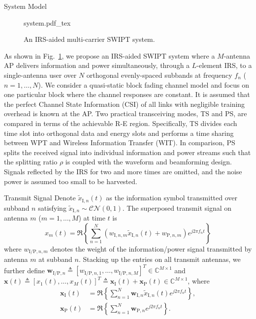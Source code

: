 \documentclass[journal]{IEEEtran}
\begin{document}
	\begin{section}{System Model}\label{se:system_model}
		\begin{figure}[!t]
			\centering
			\def\svgwidth{0.9\columnwidth}
			{system.pdf_tex}
			\caption{An IRS-aided multi-carrier SWIPT system.}
			\label{fi:system}
		\end{figure}

		As shown in Fig.~\ref{fi:system}, we propose an IRS-aided SWIPT system where a $M$-antenna AP delivers information and power simultaneously, through a $L$-element IRS, to a single-antenna user over $N$ orthogonal evenly-spaced subbands at frequency $f_n$ ($n=1,\dots,N$). We consider a quasi-static block fading channel model and focus on one particular block where the channel responses are constant. It is assumed that the perfect Channel State Information (CSI) of all links with negligible training overhead is known at the AP. Two practical transceiving modes, TS and PS, are compared in terms of the achievable R-E region. Specifically, TS divides each time slot into orthogonal data and energy slots and performs a time sharing between WPT and Wireless Information Transfer (WIT). In comparison, PS splits the received signal into individual information and power streams such that the splitting ratio $\rho$ is coupled with the waveform and beamforming design. Signals reflected by the IRS for two and more times are omitted, and the noise power is assumed too small to be harvested.


		\begin{subsection}{Transmit Signal}
			Denote $\tilde{x}_{\mathrm{I},n}(t)$ as the information symbol transmitted over subband $n$ satisfying $\tilde{x}_{\mathrm{I},n}\sim\mathcal{CN}(0,1)$. The superposed transmit signal on antenna $m$ ($m=1,\dots,M$) at time $t$ is
			\begin{equation}\label{eq:x_m}
				x_m(t)=\Re\left\{\sum_{n=1}^N\left({w_{\mathrm{I},n,m}\tilde{x}_{\mathrm{I},n}(t)}+w_{\mathrm{P},n,m}\right){e^{j2{\pi}{f_n}{t}}}\right\}
			\end{equation}
			where $w_{\mathrm{I/P},n,m}$ denotes the weight of the information/power signal transmitted by antenna $m$ at subband $n$. Stacking up the entries on all transmit antennas, we further define $\boldsymbol{w}_{\mathrm{I/P},n} \triangleq [w_{\mathrm{I/P},n,1},\dots,w_{\mathrm{I/P},n,M}]^T \in \mathbb{C}^{M \times 1}$ and $\boldsymbol{x}(t) \triangleq [x_1(t),\dots,x_M(t)]^T \triangleq \boldsymbol{x}_{\mathrm{I}}(t)+\boldsymbol{x}_{\mathrm{P}}(t) \in \mathbb{C}^{M \times 1}$, where
			\begin{align}
				\boldsymbol{x}_{\mathrm{I}}(t) &= \Re{\left\{\sum_{n=1}^N\boldsymbol{w}_{\mathrm{I},n}\tilde{x}_{\mathrm{I},n}(t){e^{j2{\pi}{f_n}{t}}}\right\}},\label{eq:x_I}\\
				\boldsymbol{x}_{\mathrm{P}}(t) &= \Re{\left\{\sum_{n=1}^N\boldsymbol{w}_{\mathrm{P},n}{e^{j2{\pi}{f_n}{t}}}\right\}}.\label{eq:x_P}
			\end{align}
		\end{subsection}



\end{section}
\end{document}
